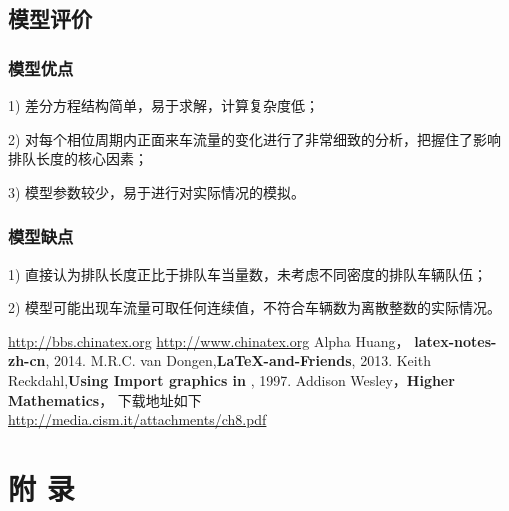 \documentclass{cumcmart}
\begin{document}
\subsection{模型评价}
\subsubsection{模型优点}
1)	差分方程结构简单，易于求解，计算复杂度低；

2)	对每个相位周期内正面来车流量的变化进行了非常细致的分析，把握住了影响排队长度的核心因素；

3)	模型参数较少，易于进行对实际情况的模拟。

\subsubsection{模型缺点}
1)	直接认为排队长度正比于排队车当量数，未考虑不同密度的排队车辆队伍；

2)	模型可能出现车流量可取任何连续值，不符合车辆数为离散整数的实际情况。
















\begin{thebibliography}{10}
 \url{http://bbs.chinatex.org}
 \url{http://www.chinatex.org}
 Alpha Huang， \textbf{latex-notes-zh-cn}, 2014.
M.R.C. van Dongen,\textbf{\LaTeX-and-Friends}, 2013.
Keith Reckdahl,\textbf{Using Import graphics in \LaTeXe}, 1997.
Addison Wesley，\textbf{Higher Mathematics}， 下载地址如下\\ \url{http://media.cism.it/attachments/ch8.pdf}
\end{thebibliography}


\newpage
\appendix
\section*{附 \quad 录}
\end{document}
